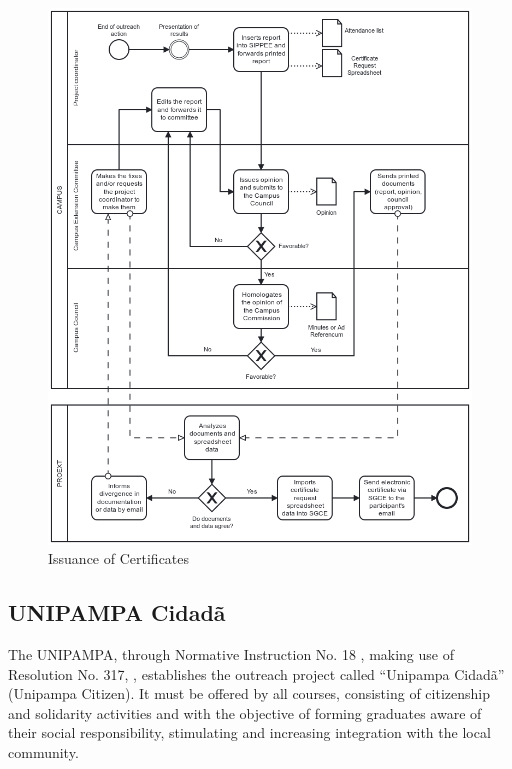 \begin{figure}[htb]
  \caption{Issuance of Certificates}\label{fig:issuance-certificates}
  \begin{center}
    \includegraphics[width=16cm]{img/3-emissaoDeCertificados.png}
  \end{center}
\end{figure}

\subsection{UNIPAMPA Cidadã}\label{sec:bac-cidada}

The \acl{UNIPAMPA}, through Normative Instruction No. 18 \cite{unipampacidada}, making use of Resolution No. 317, \cite{res317}, establishes the outreach project called ``Unipampa Cidadã'' (Unipampa Citizen). It must be offered by all courses, consisting of citizenship and solidarity activities and with the objective of forming graduates aware of their social responsibility, stimulating and increasing integration with the local community.

